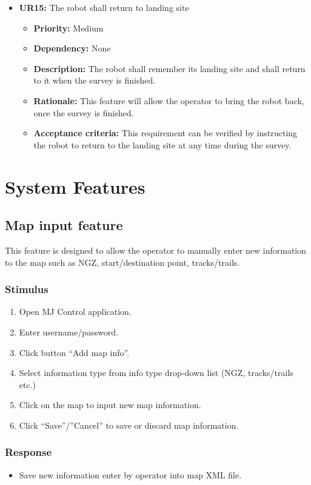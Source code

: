 \documentclass[10pt,a4paper,titlepage]{article}
\begin{document}
    \begin{itemize}
		\item \textbf{UR15:} The robot shall return to landing site
		\begin{itemize}
			\item \textbf{Priority:} Medium
            \item \textbf{Dependency:} None
			\item \textbf{Description:} The robot shall remember its landing site and shall return to it when the survey is finished.
            \item \textbf{Rationale:}  This feature will allow the operator to bring the robot back, once the survey is finished.
            \item \textbf{Acceptance criteria:} This requirement can be verified by instructing the robot to return to the landing site at any time during the survey. 
		\end{itemize} 
	\end{itemize}
   
	
	\section{System Features}
	\subsection{Map input feature}
	This feature is designed to allow the operator to manually enter new information to the map such as NGZ, start/destination point, tracks/trails.
	
	\subsubsection*{Stimulus}
	\begin{enumerate}
		\item Open MJ Control application.
		\item Enter username/password.
		\item Click button “Add map info”.
		\item Select information type from info type drop-down list (NGZ, tracks/trails etc.)
		\item Click on the map to input new map information.
		\item Click “Save”/”Cancel” to save or discard map information.
	\end{enumerate}
	
	\subsubsection*{Response}
	\begin{itemize}
		\item Save new information enter by operator into map XML file.
	\end{itemize}
	
\end{document}
